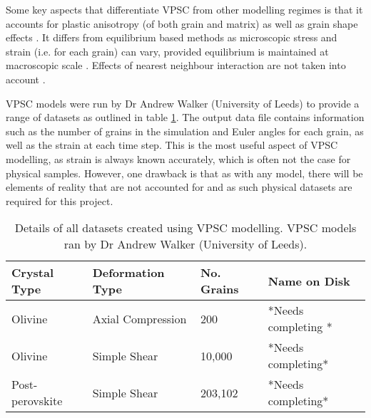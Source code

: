 \documentclass[a4paper,12pt]{report}
\numberwithin{equation}{chapter}
\begin{document}
Some key aspects that differentiate VPSC from other modelling regimes is that it accounts for plastic anisotropy (of both grain and matrix) as well as grain shape effects \citep[as introduced by][]{Lebensohn1993}. It differs from equilibrium based methods as microscopic stress and strain (i.e. for each grain) can vary, provided equilibrium is maintained at macroscopic scale \citep{Tommasi2000}. Effects of nearest neighbour interaction are not taken into account \citep[see][for details]{Castelnau1996}.

VPSC models were run by Dr Andrew Walker (University of Leeds) to provide a range of datasets as outlined in table \ref{tab:VPSC_data}. The output data file contains information such as the number of grains in the simulation and Euler angles for each grain, as well as the strain at each time step. This is the most useful aspect of VPSC modelling, as strain is always known accurately, which is often not the case for physical samples. However, one drawback is that as with any model, there will be elements of reality that are not accounted for and as such physical datasets are required for this project.

\begin{table} 
	\centering
	\caption[VPSC datasets]{Details of all datasets created using VPSC modelling. VPSC models ran by Dr Andrew Walker (University of Leeds).\\}
\begin{tabularx}{\textwidth}{X X X X}
	\hline
	\hline
	Crystal Type    & Deformation Type  & No. Grains & Name on Disk \\
	\hline
	\hline
	Olivine         & Axial Compression & 200        & *Needs completing *    \\
	Olivine         & Simple Shear      & 10,000     & *Needs completing*    \\
	Post-perovskite & Simple Shear      & 203,102    & *Needs completing*    \\
	\hline
	\end{tabularx}
\label{tab:VPSC_data}
\end{table}
\end{document}
